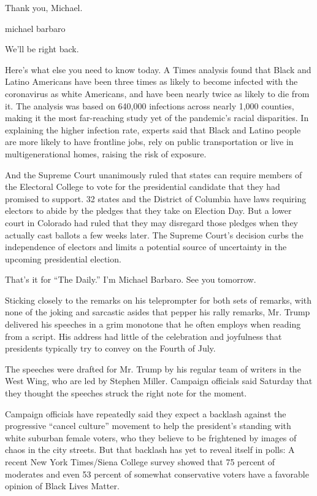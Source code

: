 Thank you, Michael.

michael barbaro

We'll be right back.

Here's what else you need to know today. A Times analysis found that
Black and Latino Americans have been three times as likely to become
infected with the coronavirus as white Americans, and have been nearly
twice as likely to die from it. The analysis was based on 640,000
infections across nearly 1,000 counties, making it the most far-reaching
study yet of the pandemic's racial disparities. In explaining the higher
infection rate, experts said that Black and Latino people are more
likely to have frontline jobs, rely on public transportation or live in
multigenerational homes, raising the risk of exposure.

And the Supreme Court unanimously ruled that states can require members
of the Electoral College to vote for the presidential candidate that
they had promised to support. 32 states and the District of Columbia
have laws requiring electors to abide by the pledges that they take on
Election Day. But a lower court in Colorado had ruled that they may
disregard those pledges when they actually cast ballots a few weeks
later. The Supreme Court's decision curbs the independence of electors
and limits a potential source of uncertainty in the upcoming
presidential election.

That's it for ``The Daily.'' I'm Michael Barbaro. See you tomorrow.

Sticking closely to the remarks on his teleprompter for both sets of
remarks, with none of the joking and sarcastic asides that pepper his
rally remarks, Mr. Trump delivered his speeches in a grim monotone that
he often employs when reading from a script. His address had little of
the celebration and joyfulness that presidents typically try to convey
on the Fourth of July.

The speeches were drafted for Mr. Trump by his regular team of writers
in the West Wing, who are led by Stephen Miller. Campaign officials said
Saturday that they thought the speeches struck the right note for the
moment.

Campaign officials have repeatedly said they expect a backlash against
the progressive ``cancel culture'' movement to help the president's
standing with white suburban female voters, who they believe to be
frightened by images of chaos in the city streets. But that backlash has
yet to reveal itself in polls: A recent New York Times/Siena College
survey showed that 75 percent of moderates and even 53 percent of
somewhat conservative voters have a favorable opinion of Black Lives
Matter.

